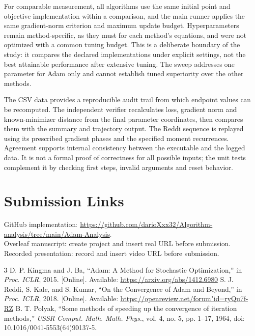 \documentclass[conference]{IEEEtran}
\begin{document}
For comparable measurement, all algorithms use the same initial point and objective implementation within a comparison, and the main runner applies the same gradient-norm criterion and maximum update budget. Hyperparameters remain method-specific, as they must for each method's equations, and were not optimized with a common tuning budget. This is a deliberate boundary of the study: it compares the declared implementations under explicit settings, not the best attainable performance after extensive tuning. The sweep addresses one parameter for Adam only and cannot establish tuned superiority over the other methods.

The CSV data provides a reproducible audit trail from which endpoint values can be recomputed. The independent verifier recalculates loss, gradient norm and known-minimizer distance from the final parameter coordinates, then compares them with the summary and trajectory output. The Reddi sequence is replayed using its prescribed gradient phases and the specified moment recurrences. Agreement supports internal consistency between the executable and the logged data. It is not a formal proof of correctness for all possible inputs; the unit tests complement it by checking first steps, invalid arguments and reset behavior.

\section*{Submission Links}
GitHub implementation: \url{https://github.com/darioXxx32/Algorithm-analysis/tree/main/Adam-Analysis}.\\
Overleaf manuscript: create project and insert real URL before submission.\\
Recorded presentation: record and insert video URL before submission.

\begin{thebibliography}{3}
 D. P. Kingma and J. Ba, ``Adam: A Method for Stochastic Optimization,'' in \emph{Proc. ICLR}, 2015. [Online]. Available: \url{https://arxiv.org/abs/1412.6980}
 S. J. Reddi, S. Kale, and S. Kumar, ``On the Convergence of Adam and Beyond,'' in \emph{Proc. ICLR}, 2018. [Online]. Available: \url{https://openreview.net/forum"id=ryQu7f-RZ}
 B. T. Polyak, ``Some methods of speeding up the convergence of iteration methods,'' \emph{USSR Comput. Math. Math. Phys.}, vol. 4, no. 5, pp. 1--17, 1964, doi: 10.1016/0041-5553(64)90137-5.
\end{thebibliography}
\end{document}
